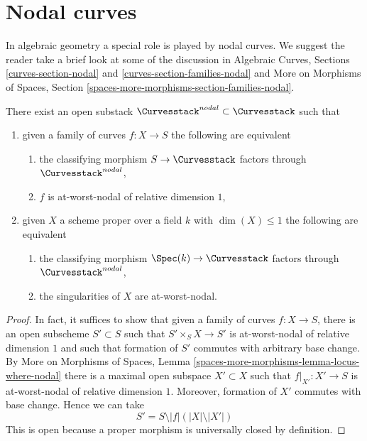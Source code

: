 \section{Nodal curves}
\label{section-nodal-curves}

\noindent
In algebraic geometry a special role is played by nodal curves.
We suggest the reader take a brief look at some of the discussion
in Algebraic Curves, Sections \ref{curves-section-nodal} and
\ref{curves-section-families-nodal}
and More on Morphisms of Spaces, Section
\ref{spaces-more-morphisms-section-families-nodal}.

\begin{lemma}
\label{lemma-nodal-curves}
There exist an open substack $\Curvesstack^{nodal} \subset \Curvesstack$
such that
\begin{enumerate}
\item given a family of curves $f : X \to S$ the following are equivalent
\begin{enumerate}
\item the classifying morphism $S \to \Curvesstack$ factors
through $\Curvesstack^{nodal}$,
\item $f$ is at-worst-nodal of relative dimension $1$,
\end{enumerate}
\item given $X$ a scheme proper over a field $k$ with
$\dim(X) \leq 1$ the following are equivalent
\begin{enumerate}
\item the classifying morphism $\Spec(k) \to \Curvesstack$ factors
through $\Curvesstack^{nodal}$,
\item the singularities of $X$ are at-worst-nodal.
\end{enumerate}
\end{enumerate}
\end{lemma}

\begin{proof}
In fact, it suffices to show that given a family of curves
$f : X \to S$, there is an open subscheme $S' \subset S$
such that $S' \times_S X \to S'$ is at-worst-nodal of relative dimension $1$
and such that formation of $S'$ commutes with arbitrary base change.
By More on Morphisms of Spaces, Lemma
\ref{spaces-more-morphisms-lemma-locus-where-nodal}
there is a maximal open subspace $X' \subset X$ such
that $f|_{X'} : X' \to S$ is at-worst-nodal of relative dimension $1$.
Moreover, formation of $X'$ commutes with base change.
Hence we can take
$$
S' = S \setminus |f|(|X| \setminus |X'|)
$$
This is open because a proper morphism is universally closed by
definition.
\end{proof}

